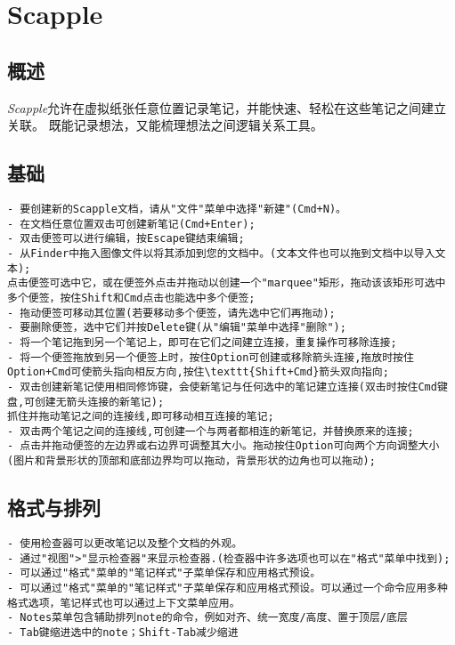 \documentclass{../main.tex}{subfiles}
\begin{document}
\chapter{Scapple}
\section{概述}
\emph{Scapple}允许在虚拟纸张任意位置记录笔记，并能快速、轻松在这些笔记之间建立关联。
既能记录想法，又能梳理想法之间逻辑关系工具。

\section{基础}
\begin{lstlisting}[style=lstCodeStylePlainText]
- 要创建新的Scapple文档，请从"文件"菜单中选择"新建"(Cmd+N)。
- 在文档任意位置双击可创建新笔记(Cmd+Enter);
- 双击便签可以进行编辑，按Escape键结束编辑;
- 从Finder中拖入图像文件以将其添加到您的文档中。(文本文件也可以拖到文档中以导入文本);
点击便签可选中它，或在便签外点击并拖动以创建一个"marquee"矩形，拖动该该矩形可选中多个便签，按住Shift和Cmd点击也能选中多个便签;
- 拖动便签可移动其位置(若要移动多个便签，请先选中它们再拖动);
- 要删除便签，选中它们并按Delete键(从"编辑"菜单中选择"删除");
- 将一个笔记拖到另一个笔记上，即可在它们之间建立连接，重复操作可移除连接;
- 将一个便签拖放到另一个便签上时，按住Option可创建或移除箭头连接,拖放时按住Option+Cmd可使箭头指向相反方向,按住\texttt{Shift+Cmd}箭头双向指向;
- 双击创建新笔记使用相同修饰键，会使新笔记与任何选中的笔记建立连接(双击时按住Cmd键盘,可创建无箭头连接的新笔记);
抓住并拖动笔记之间的连接线,即可移动相互连接的笔记;
- 双击两个笔记之间的连接线,可创建一个与两者都相连的新笔记，并替换原来的连接;
- 点击并拖动便签的左边界或右边界可调整其大小。拖动按住Option可向两个方向调整大小(图片和背景形状的顶部和底部边界均可以拖动，背景形状的边角也可以拖动);
\end{lstlisting}

\section{格式与排列}
\begin{lstlisting}[style=lstCodeStylePlainText]
- 使用检查器可以更改笔记以及整个文档的外观。
- 通过"视图">"显示检查器"来显示检查器.(检查器中许多选项也可以在"格式"菜单中找到);
- 可以通过"格式"菜单的"笔记样式"子菜单保存和应用格式预设。
- 可以通过"格式"菜单的"笔记样式"子菜单保存和应用格式预设。可以通过一个命令应用多种格式选项，笔记样式也可以通过上下文菜单应用。
- Notes菜单包含辅助排列note的命令，例如对齐、统一宽度/高度、置于顶层/底层
- Tab键缩进选中的note；Shift-Tab减少缩进
\end{lstlisting}
\end{document}
